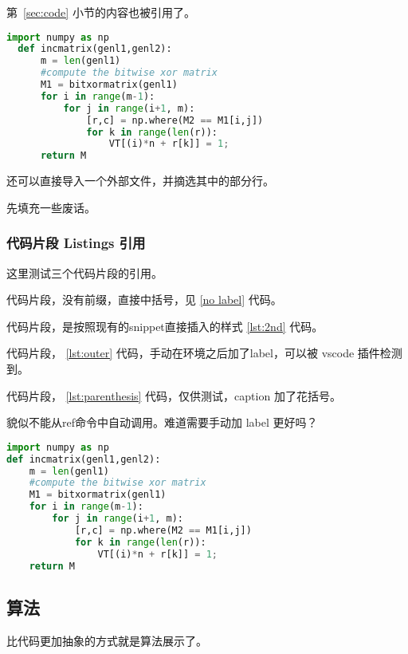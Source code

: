\documentclass[../Main/thesis]{subfiles}
\begin{document}
第~\ref{sec:code} 小节的内容也被引用了。

\begin{lstlisting}[language=Python,
  caption=中文标题没有括号,
  label=lst:outer,
  style=colorEX]
  import numpy as np
  def incmatrix(genl1,genl2):
      m = len(genl1)
      #compute the bitwise xor matrix
      M1 = bitxormatrix(genl1)
      for i in range(m-1):
          for j in range(i+1, m):
              [r,c] = np.where(M2 == M1[i,j])
              for k in range(len(r)):
                  VT[(i)*n + r[k]] = 1;
      return M
\end{lstlisting}

还可以直接导入一个外部文件，并摘选其中的部分行。



先填充一些废话。\zhlipsum[12]

\subsubsection{代码片段 Listings 引用}

这里测试三个代码片段的引用。

代码片段，没有前缀，直接中括号，见 \ref{no label} 代码。

代码片段，是按照现有的snippet直接插入的样式 \ref{lst:2nd} 代码。

代码片段， \ref{lst:outer} 代码，手动在环境之后加了label，可以被 vscode 插件检测到。

代码片段， \ref{lst:parenthesis} 代码，仅供测试，caption 加了花括号。

貌似不能从ref命令中自动调用。难道需要手动加 label 更好吗？
\begin{lstlisting}[language=Python,
  caption={Must have Parenthesis},
  label=lst:parenthesis]
import numpy as np
def incmatrix(genl1,genl2):
    m = len(genl1)
    #compute the bitwise xor matrix
    M1 = bitxormatrix(genl1)
    for i in range(m-1):
        for j in range(i+1, m):
            [r,c] = np.where(M2 == M1[i,j])
            for k in range(len(r)):
                VT[(i)*n + r[k]] = 1;
    return M
\end{lstlisting}
\subsection{算法}
\label{ssc:algo}

比代码更加抽象的方式就是算法展示了。
\end{document}
